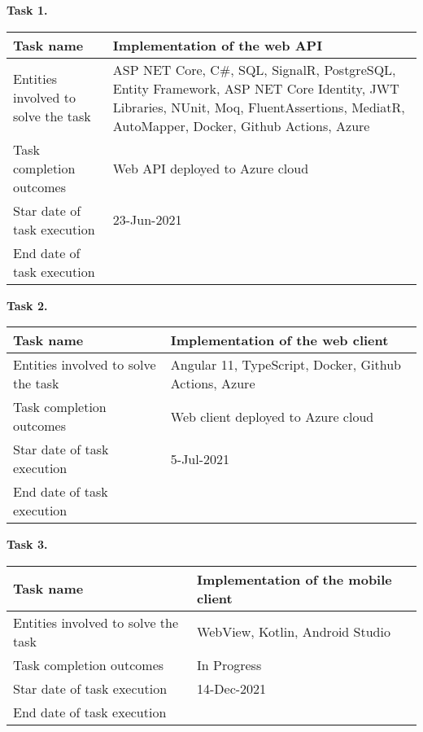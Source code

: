 \textbf{Task 1.}\\
\begin{tabular}{|p{}|p{}|}
    \hline
    Task name                   & Implementation of the web API   \\
    \hline
    Entities involved to solve the task & ASP NET Core, C\#, SQL, SignalR, PostgreSQL,
    Entity Framework, ASP NET Core Identity,
    JWT Libraries, NUnit, Moq, FluentAssertions, MediatR, AutoMapper, Docker, Github Actions, Azure \\
    \hline
    Task completion outcomes    & Web API deployed to Azure cloud \\
    \hline
    Star date of task execution & 23-Jun-2021                     \\
    \hline
    End date of task execution  &                                 \\
    \hline
\end{tabular}
\vskip 5mm
\textbf{Task 2.}\\
\begin{tabular}{|p{}|p{}|}
    \hline
    Task name                           & Implementation of the web client                      \\
    \hline
    Entities involved to solve the task & Angular 11, TypeScript, Docker, Github Actions, Azure \\
    \hline
    Task completion outcomes            & Web client deployed to Azure cloud                    \\
    \hline
    Star date of task execution         & 5-Jul-2021                                            \\
    \hline
    End date of task execution          &                                                       \\
    \hline
\end{tabular}
\vskip 5mm
\textbf{Task 3.}\\
\begin{tabular}{|p{}|p{}|}
    \hline
    Task name                           & Implementation of the mobile client \\
    \hline
    Entities involved to solve the task & WebView, Kotlin, Android Studio     \\
    \hline
    Task completion outcomes            & In Progress                         \\
    \hline
    Star date of task execution         & 14-Dec-2021                         \\
    \hline
    End date of task execution          &                                     \\
    \hline
\end{tabular}
